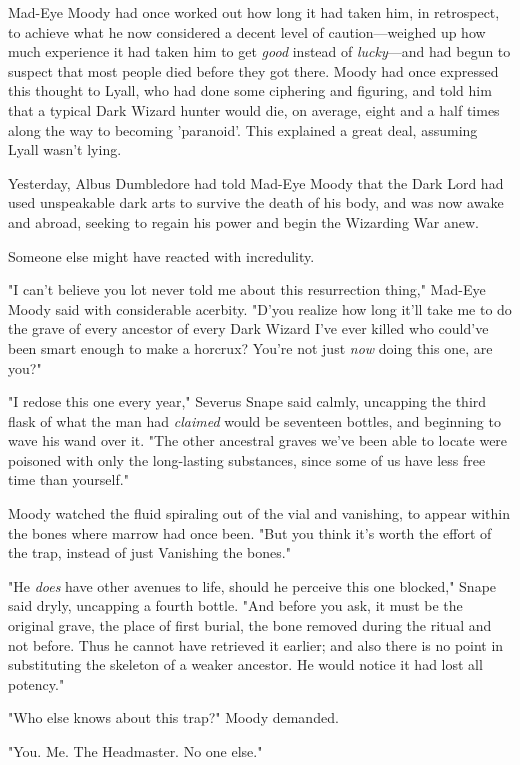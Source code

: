 Mad-Eye Moody had once worked out how long it had taken him, in retrospect, to 
achieve what he now considered a decent level of caution---weighed up how much 
experience it had taken him to get \emph{good} instead of \emph{lucky}---and 
had begun to suspect that most people died before they got there. Moody had 
once expressed this thought to Lyall, who had done some ciphering and figuring, 
and told him that a typical Dark Wizard hunter would die, on average, eight and 
a half times along the way to becoming 'paranoid'. This explained a great deal, 
assuming Lyall wasn't lying.

Yesterday, Albus Dumbledore had told Mad-Eye Moody that the Dark Lord had used 
unspeakable dark arts to survive the death of his body, and was now awake and 
abroad, seeking to regain his power and begin the Wizarding War anew.

Someone else might have reacted with incredulity.

"I can't believe you lot never told me about this resurrection thing," Mad-Eye 
Moody said with considerable acerbity. "D'you realize how long it'll take me to 
do the grave of every ancestor of every Dark Wizard I've ever killed who 
could've been smart enough to make a horcrux? You're not just \emph{now} doing 
this one, are you?"

"I redose this one every year," Severus Snape said calmly, uncapping the third 
flask of what the man had \emph{claimed} would be seventeen bottles, and 
beginning to wave his wand over it. "The other ancestral graves we've been able 
to locate were poisoned with only the long-lasting substances, since some of us 
have less free time than yourself."

Moody watched the fluid spiraling out of the vial and vanishing, to appear 
within the bones where marrow had once been. "But you think it's worth the 
effort of the trap, instead of just Vanishing the bones."

"He \emph{does} have other avenues to life, should he perceive this one 
blocked," Snape said dryly, uncapping a fourth bottle. "And before you ask, it 
must be the original grave, the place of first burial, the bone removed during 
the ritual and not before. Thus he cannot have retrieved it earlier; and also 
there is no point in substituting the skeleton of a weaker ancestor. He would 
notice it had lost all potency."

"Who else knows about this trap?" Moody demanded.

"You. Me. The Headmaster. No one else."

